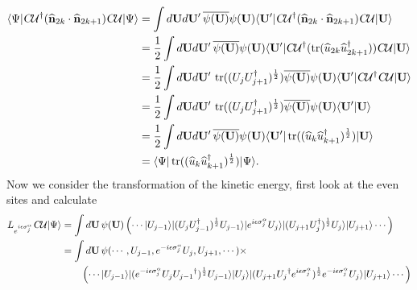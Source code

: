 \documentclass[12pt]{amsart}
\newcommand{\tr}{\operatorname{tr}}
\theoremstyle{definition}
\theoremstyle{remark}
\numberwithin{equation}{section}
\begin{document}
\begin{equation}
	\begin{split}
		\langle \Psi|\textsl{C}\mathcal{U}^\dag (\widehat{\mathbf{n}}_{2k}\cdot \widehat{\mathbf{n}}_{2k+1} )\textsl{C}\mathcal{U}|\Psi\rangle &= \int d\mathbf{U}d\mathbf{U}'\, \overline{\psi(\mathbf{U})}\psi(\mathbf{U})  \langle \mathbf{U}'|\textsl{C}\mathcal{U}^\dag (\widehat{\mathbf{n}}_{2k}\cdot \widehat{\mathbf{n}}_{2k+1} )\textsl{C}\mathcal{U}|\mathbf{U}\rangle \\
		&= \frac12\int d\mathbf{U}d\mathbf{U}'\, \overline{\psi(\mathbf{U})}\psi(\mathbf{U})  \langle \mathbf{U}'|\textsl{C}\mathcal{U}^\dag ( \tr(\widehat{u}_{2k}\widehat{u}^\dag_{2k+1}) )\textsl{C}\mathcal{U}|\mathbf{U}\rangle \\
		&= \frac12\int d\mathbf{U}d\mathbf{U}'\,  \tr((U_{j} U_{j+1}^\dag)^{\frac12} )  \overline{\psi(\mathbf{U})}\psi(\mathbf{U})  \langle \mathbf{U}'|\textsl{C}\mathcal{U}^\dag \textsl{C}\mathcal{U}|\mathbf{U}\rangle \\
		&= \frac12\int d\mathbf{U}d\mathbf{U}'\,  \tr((U_{j} U_{j+1}^\dag)^{\frac12} )  \overline{\psi(\mathbf{U})}\psi(\mathbf{U})  \langle \mathbf{U}'|\mathbf{U}\rangle \\
		&= \frac12\int d\mathbf{U}d\mathbf{U}'\,    \overline{\psi(\mathbf{U})}\psi(\mathbf{U})  \langle \mathbf{U}'|\tr((\widehat{u}_{k}\widehat{u}^\dag_{k+1})^{\frac12} )|\mathbf{U}\rangle \\
		&= \langle \Psi|\tr((\widehat{u}_{k}\widehat{u}^\dag_{k+1})^{\frac12} )|\Psi\rangle.
	\end{split}
\end{equation}
Now we consider the transformation of the kinetic energy, first look at the even sites and calculate
\begin{equation}
	\begin{split}
		L_{e^{i\epsilon \sigma^\alpha_j}}\textsl{C}\mathcal{U} |\Psi\rangle &= \int d\mathbf{U}\,\psi(\mathbf{U}) \left(\cdots |U_{j-1}\rangle |(U_{j} U_{j-1}^\dag)^{\frac12} U_{j-1}\rangle |e^{i\epsilon\sigma^\alpha_j}U_{j}\rangle  |(U_{j+1} U_{j}^\dag)^{\frac12} U_{j}\rangle|U_{j+1}\rangle\cdots\right) \\
		&= \int d\mathbf{U}\,\psi(\cdots, U_{j-1},e^{-i\epsilon\sigma^\alpha_j}U_{j}, U_{j+1},\cdots) \times \\&\quad\quad  \left(\cdots |U_{j-1}\rangle |(e^{-i\epsilon\sigma^\alpha_j}U_{j} {U_{j-1}}^\dag)^{\frac12} U_{j-1}\rangle |U_{j}\rangle  |(U_{j+1} {U_{j}}^\dag e^{i\epsilon\sigma^\alpha_j})^{\frac12} e^{-i\epsilon\sigma^\alpha_j}U_{j}\rangle|U_{j+1}\rangle\cdots \right)
	\end{split}
\end{equation}
\end{document}
